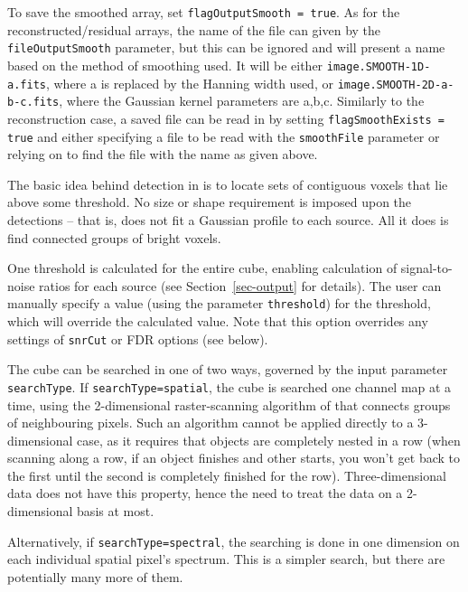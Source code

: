 To save the smoothed array, set \texttt{flagOutputSmooth = true}. As
for the reconstructed/residual arrays, the
name of the file can given by the \texttt{fileOutputSmooth} parameter,
but this can be ignored and \duchamp will present a name based on the
method of smoothing used. It will be either
\texttt{image.SMOOTH-1D-a.fits}, where a is replaced by the Hanning
width used, or \texttt{image.SMOOTH-2D-a-b-c.fits}, where the Gaussian
kernel parameters are a,b,c. Similarly to the reconstruction case, a
saved file can be read in by setting \texttt{flagSmoothExists = true}
and either specifying a file to be read with the \texttt{smoothFile}
parameter or relying on \duchamp to find the file with the name as
given above.


\label{sec-detection}


The basic idea behind detection in \duchamp is to locate sets of
contiguous voxels that lie above some threshold. No size or shape
requirement is imposed upon the detections -- that is, \duchamp does
not fit \eg a Gaussian profile to each source. All it does is find
connected groups of bright voxels.

One threshold is calculated for the entire cube, enabling calculation
of signal-to-noise ratios for each source (see
Section~\ref{sec-output} for details). The user can manually specify a
value (using the parameter \texttt{threshold}) for the threshold,
which will override the calculated value. Note that this option
overrides any settings of \texttt{snrCut} or FDR options (see below). 

The cube can be searched in one of two ways, governed by the input
parameter \texttt{searchType}. If \texttt{searchType=spatial}, the
cube is searched one channel map at a time, using the 2-dimensional
raster-scanning algorithm of \citet{lutz80} that connects groups of
neighbouring pixels. Such an algorithm cannot be applied directly to a
3-dimensional case, as it requires that objects are completely nested
in a row (when scanning along a row, if an object finishes and other
starts, you won't get back to the first until the second is completely
finished for the row). Three-dimensional data does not have this
property, hence the need to treat the data on a 2-dimensional basis at
most.

Alternatively, if \texttt{searchType=spectral}, the searching is done
in one dimension on each individual spatial pixel's spectrum. This is
a simpler search, but there are potentially many more of them.

